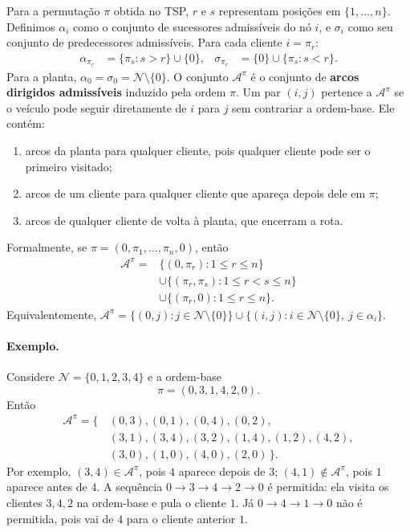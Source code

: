 \documentclass[11pt,a4paper]{article}
\newcommand{\N}{\mathcal{N}}
\newcommand{\A}{\mathcal{A}}
\begin{document}
Para a permutação $\pi$ obtida no TSP, $r$ e $s$ representam posições em $\{1,\ldots,n\}$. Definimos $\alpha_i$ como o conjunto de sucessores admissíveis do nó $i$, e $\sigma_i$ como seu conjunto de predecessores admissíveis. Para cada cliente $i=\pi_r$:
\begin{align*}
 \alpha_{\pi_r} &= \{\pi_s:s>r\}\cup\{0\}, &
 \sigma_{\pi_r} &= \{0\}\cup\{\pi_s:s<r\}.
\end{align*}
Para a planta, $\alpha_0=\sigma_0=\N\setminus\{0\}$. O conjunto $\A^\pi$ é o conjunto de \textbf{arcos dirigidos admissíveis} induzido pela ordem $\pi$. Um par $(i,j)$ pertence a $\A^\pi$ se o veículo pode seguir diretamente de $i$ para $j$ sem contrariar a ordem-base. Ele contém:
\begin{enumerate}
    \item arcos da planta para qualquer cliente, pois qualquer cliente pode ser o primeiro visitado;
    \item arcos de um cliente para qualquer cliente que apareça depois dele em $\pi$;
    \item arcos de qualquer cliente de volta à planta, que encerram a rota.
\end{enumerate}
Formalmente, se $\pi=(0,\pi_1,\ldots,\pi_n,0)$, então
\begin{align}
 \A^\pi={}&\{(0,\pi_r):1\le r\le n\}\nonumber\\
 &\cup\{(\pi_r,\pi_s):1\le r<s\le n\}\nonumber\\
 &\cup\{(\pi_r,0):1\le r\le n\}. \label{eq:ordered-arc-set}
\end{align}
Equivalentemente, $\A^\pi=\{(0,j):j\in\N\setminus\{0\}\}\cup\{(i,j):i\in\N\setminus\{0\},\ j\in\alpha_i\}$.

\paragraph{Exemplo.} Considere $\N=\{0,1,2,3,4\}$ e a ordem-base
\[
 \pi=(0,3,1,4,2,0).
\]
Então
\begin{align*}
 \A^\pi=\{\,&(0,3),(0,1),(0,4),(0,2),\\
 &(3,1),(3,4),(3,2),(1,4),(1,2),(4,2),\\
 &(3,0),(1,0),(4,0),(2,0)\,\}.
\end{align*}
Por exemplo, $(3,4)\in\A^\pi$, pois $4$ aparece depois de $3$; $(4,1)\notin\A^\pi$, pois $1$ aparece antes de $4$. A sequência $0\to3\to4\to2\to0$ é permitida: ela visita os clientes $3,4,2$ na ordem-base e pula o cliente $1$. Já $0\to4\to1\to0$ não é permitida, pois vai de $4$ para o cliente anterior $1$.
\end{document}
